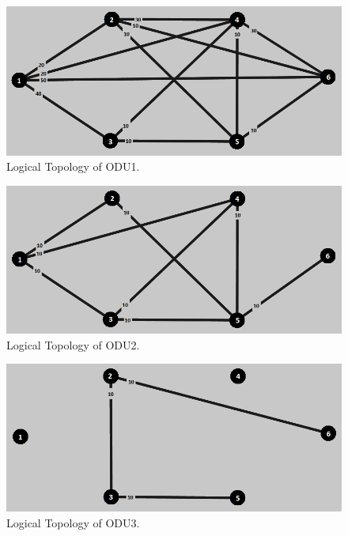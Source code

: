 \begin{figure}[H]
\centering
\includegraphics[width=13cm]{sdf/heuristic/figures/topologies/opaque_protec/medium/logical_topology_odu1_medium}
\caption{Logical Topology of ODU1.}
\label{logical_ODU1_protec_ref_medium_heuristic}
\end{figure}

\begin{figure}[H]
\centering
\includegraphics[width=13cm]{sdf/heuristic/figures/topologies/opaque_protec/medium/logical_topology_odu2_medium}
\caption{Logical Topology of ODU2.}
\label{logical_ODU2_protec_ref_medium_heuristic}
\end{figure}

\begin{figure}[H]
\centering
\includegraphics[width=13cm]{sdf/heuristic/figures/topologies/opaque_protec/medium/logical_topology_odu3_medium}
\caption{Logical Topology of ODU3.}
\label{logical_ODU3_protec_ref_medium_heuristic}
\end{figure}

